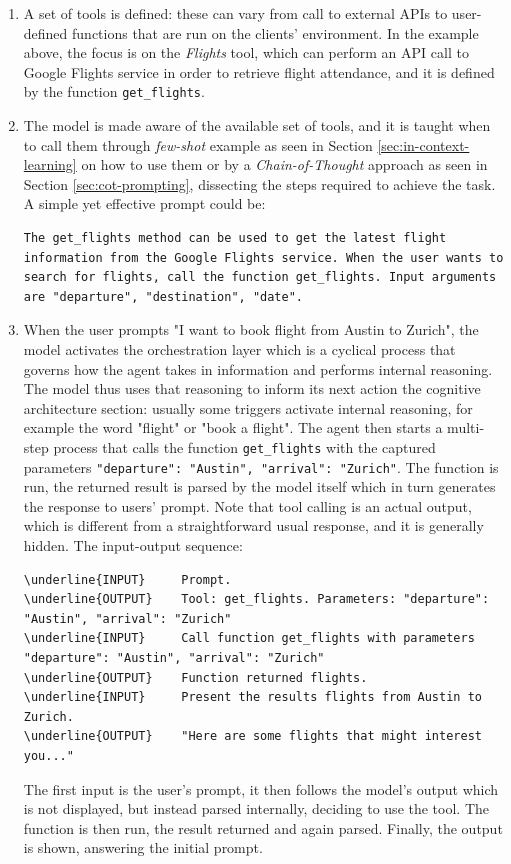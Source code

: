 \begin{enumerate}
    \item A set of tools is defined: these can vary from call to external APIs to user-defined functions that are run on the clients' environment. In the example above, the focus is on the \textit{Flights} tool, which can perform an API call to Google Flights service in order to retrieve flight attendance, and it is defined by the function \verb|get_flights|.
    \item The model is made aware of the available set of tools, and it is taught when to call them through \textit{few-shot} example as seen in Section \ref{sec:in-context-learning} on how to use them or by a \textit{Chain-of-Thought} approach as seen in Section \ref{sec:cot-prompting}, dissecting the steps required to achieve the task. A simple yet effective prompt could be:
    
    \begin{Verbatim}[breaklines=true]
The get_flights method can be used to get the latest flight information from the Google Flights service. When the user wants to search for flights, call the function get_flights. Input arguments are "departure", "destination", "date".
    \end{Verbatim}

    \item When the user prompts "I want to book flight from Austin to Zurich", the model activates the orchestration layer which is a cyclical process that governs how the agent takes in information and performs internal reasoning. The model thus uses that reasoning to inform its next action the cognitive architecture section: usually some triggers activate internal reasoning, for example the word "flight" or "book a flight". The agent then starts a multi-step process that calls the function \verb|get_flights| with the captured parameters \verb|"departure": "Austin", "arrival": "Zurich"|. The function is run, the returned result is parsed by the model itself which in turn generates the response to users' prompt.
    Note that tool calling is an actual output, which is different from a straightforward usual response, and it is generally hidden. The input-output sequence:
        \begin{Verbatim}[breaklines=true]
\underline{INPUT}     Prompt.
\underline{OUTPUT}    Tool: get_flights. Parameters: "departure": "Austin", "arrival": "Zurich"
\underline{INPUT}     Call function get_flights with parameters "departure": "Austin", "arrival": "Zurich"
\underline{OUTPUT}    Function returned flights.
\underline{INPUT}     Present the results flights from Austin to Zurich.
\underline{OUTPUT}    "Here are some flights that might interest you..."
        \end{Verbatim}
    The first input is the user's prompt, it then follows the model's output which is not displayed, but instead parsed internally, deciding to use the tool. The function is then run, the result returned and again parsed. Finally, the output is shown, answering the initial prompt.
\end{enumerate}

